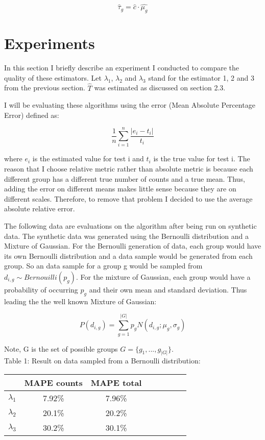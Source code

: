 \documentclass[a4paper]{article}
\begin{document}
$$\hat{ \tau}_g = \hat{c} \cdot \hat{\mu_g} $$


\section{Experiments}
In this section I briefly describe an experiment I conducted to compare the quality of these estimators.
Let $\lambda_1$, $\lambda_2$ and $\lambda_3$ stand for the estimator 1, 2 and 3 from the previous section.
$\hat{T}$ was estimated as discussed on section 2.3.

I will be evaluating these algorithms using the error (Mean Absolute Percentage Error) defined as:

$$\frac{1}{n}\sum^{n}_{i=1}\frac{|e_i - t_i|}{t_i}$$

where $e_i$ is the estimated value for test i and $t_i$ is the true value for test i.
The reason that I choose relative metric rather than absolute metric is because each different group has a different true number of counts and a true mean.
Thus, adding the error on different means makes little sense because they are on different scales.
Therefore, to remove that problem I decided to use the average absolute relative error.

The following data are evaluations on the algorithm after being run on synthetic data. 
The synthetic data was generated using the Bernoulli distribution and a Mixture of Gaussian.
For the Bernoulli generation of data, each group would have its own Bernoulli distribution and a data sample would be generated from each group. 
So an data sample for a group g would be sampled from $d_{i,g} \sim Bernouilli(p_g)$.
For the mixture of Gaussian, each group would have a probability of occurring $p_g$ and their own mean and standard deviation. 
Thus leading the the well known Mixture of Gaussian:

$$P(d_{i,g}) = \sum^{|G|}_{g=1} p_g N(d_{i,g} ; \mu_g, \sigma_g)$$

Note, G is the set of possible groups $G = \{ g_1, ..., g_{|G|} \}$.
\\

Table 1: Result on data sampled from a Bernoulli distribution:

\begin{tabular}{l*{6}{c}r}
  & MAPE counts & MAPE total  \\
\hline
$\lambda_1$ & 7.92\% &  7.96\% \\
$\lambda_2$  & 20.1\% & 20.2\%   \\
$\lambda_3$  & 30.2\% & 30.1\%    \\
\end{tabular} \\ \\
\end{document}
